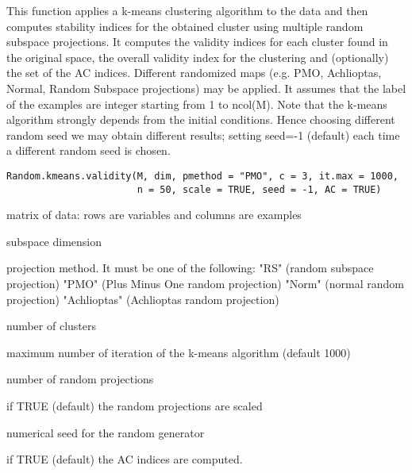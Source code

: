 \documentclass{article}
\begin{document}
\begin{Description}\relax
This function applies a k-means clustering algorithm to the data and then computes stability indices for the
obtained cluster using multiple random subspace projections. 
It computes the validity indices for each cluster found in the original space, the overall validity index for the
clustering and (optionally) the set of the AC indices.
Different randomized maps (e.g. PMO, Achlioptas, Normal, Random Subspace projections) may be applied.
It assumes that the label of the examples are integer starting from 1 to ncol(M).
Note that the k-means algorithm strongly depends from the initial conditions. Hence choosing  different random seed
we may obtain different results; setting seed=-1 (default) each time a different random seed is chosen.
\end{Description}
\begin{Usage}
\begin{verbatim}
Random.kmeans.validity(M, dim, pmethod = "PMO", c = 3, it.max = 1000, 
                       n = 50, scale = TRUE, seed = -1, AC = TRUE)
\end{verbatim}
\end{Usage}
\begin{Arguments}
\begin{ldescription}
\item[\code{M}] matrix of data: rows are variables and columns are examples 
\item[\code{dim}] subspace dimension 
\item[\code{pmethod}] projection method. It must be one of the following: 
"RS" (random subspace projection)
"PMO" (Plus Minus One random projection)
"Norm" (normal random projection)
"Achlioptas" (Achlioptas random projection) 
\item[\code{c}] number of clusters 
\item[\code{it.max}] maximum number of iteration of the k-means algorithm (default 1000) 
\item[\code{n}] number of  random projections 
\item[\code{scale}] if TRUE (default) the random projections are scaled 
\item[\code{seed}] numerical seed for the random generator 
\item[\code{AC}] if TRUE (default) the AC indices are computed. 
\end{ldescription}
\end{Arguments}
\end{document}
